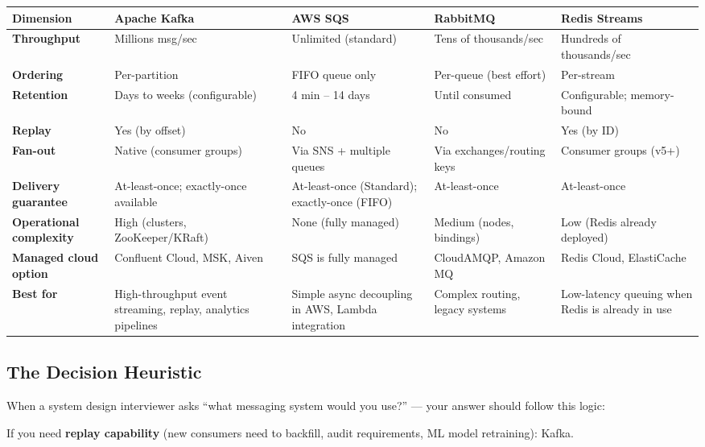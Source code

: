 \documentclass[11pt,a4paper]{article}
\begin{document}
\begin{center}
\renewcommand{\arraystretch}{1.4}
\begin{tabularx}{\textwidth}{>{\bfseries\small}p{3cm} X X X X}
  \toprule
  \small\textbf{Dimension} & \small\textbf{Apache Kafka} & \small\textbf{AWS SQS} & \small\textbf{RabbitMQ} & \small\textbf{Redis Streams} \\
  \midrule
  Throughput & Millions msg/sec & Unlimited (standard) & Tens of thousands/sec & Hundreds of thousands/sec \\
  \addlinespace
  Ordering & Per-partition & FIFO queue only & Per-queue (best effort) & Per-stream \\
  \addlinespace
  Retention & Days to weeks (configurable) & 4 min -- 14 days & Until consumed & Configurable; memory-bound \\
  \addlinespace
  Replay & Yes (by offset) & No & No & Yes (by ID) \\
  \addlinespace
  Fan-out & Native (consumer groups) & Via SNS + multiple queues & Via exchanges/routing keys & Consumer groups (v5+) \\
  \addlinespace
  Delivery guarantee & At-least-once; exactly-once available & At-least-once (Standard); exactly-once (FIFO) & At-least-once & At-least-once \\
  \addlinespace
  Operational complexity & High (clusters, ZooKeeper/KRaft) & None (fully managed) & Medium (nodes, bindings) & Low (Redis already deployed) \\
  \addlinespace
  Managed cloud option & Confluent Cloud, MSK, Aiven & SQS is fully managed & CloudAMQP, Amazon MQ & Redis Cloud, ElastiCache \\
  \addlinespace
  Best for & High-throughput event streaming, replay, analytics pipelines & Simple async decoupling in AWS, Lambda integration & Complex routing, legacy systems & Low-latency queuing when Redis is already in use \\
  \bottomrule
\end{tabularx}
\end{center}

\subsection{The Decision Heuristic}

When a system design interviewer asks ``what messaging system would you use?'' --- your answer should follow this logic:

If you need \textbf{replay capability} (new consumers need to backfill, audit requirements, ML model retraining): Kafka.
\end{document}
